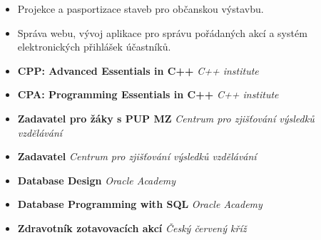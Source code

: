 \documentclass[10pt,a4paper,ragged2e]{altacv}
\begin{document}
\divider

\begin{itemize}
\item Projekce a pasportizace staveb pro občanskou výstavbu.
\end{itemize}

\divider

\begin{itemize}
\item Správa webu, vývoj aplikace pro správu pořádaných akcí a systém elektronických přihlášek účastníků.

\end{itemize}


\smallskip
\begin{itemize}
\smallskip
\item \textbf{CPP: Advanced Essentials in C++} \textit{C++ institute}
\smallskip
\item \textbf{CPA: Programming Essentials in C++} \textit{C++ institute}
\smallskip
\item \textbf{Zadavatel pro žáky s PUP MZ} \textit{Centrum pro zjišťování výsledků vzdělávání}
\smallskip
\item \textbf{Zadavatel} \textit{Centrum pro zjišťování výsledků vzdělávání}
\smallskip
\item \textbf{Database Design} \textit{Oracle Academy}
\smallskip
\item \textbf{Database Programming with SQL} \textit{Oracle Academy}
\smallskip
\item \textbf{Zdravotník zotavovacích akcí} \textit{Český červený kříž}
\end{itemize}




\clearpage


\nocite{*}






\end{document}
